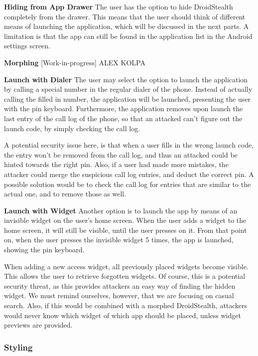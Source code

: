 \textbf{Hiding from App Drawer}
The user has the option to hide DroidStealth completely from the drawer. This 
means that the user should think of different means of launching the application, 
which will be discussed in the next parts. A limitation is that the app can still be found
in the application list in the Android settings screen. 

\textbf{Morphing}
[Work-in-progress] ALEX KOLPA

\textbf{Launch with Dialer}
The user may select the option to launch the application by calling a special number
in the regular dialer of the phone. Instead of actually calling the filled in number, the
application will be launched, presenting the user with the pin keyboard. Furthermore,
the application removes upon launch the last entry of the call log of the phone, so that
an attacked can't figure out the launch code, by simply checking the call log.

A potential security issue here, is that when a user fills in the wrong launch code, the 
entry won't be removed from the call log, and thus an attacked could be hinted towards
the right pin. Also, if a user had made more mistakes, the attacker could merge the 
suspicious call log entries, and deduct the correct pin. A possible solution would be to
check the call log for entries that are similar to the actual one, and to remove those as well.

\textbf{Launch with Widget}
Another option is to launch the app by means of an invisible widget on the user's home screen. 
When the user adds a widget to the home screen, it will still be visible, until the user presses on it. 
From that point on, when the user presses the invisible widget 5 times, the app is launched, showing the pin keyboard.

When adding a new access widget, all previously placed widgets become visible. This allows 
the user to retrieve forgotten widgets. Of course, this is a potential security threat, as this 
provides attackers an easy way of finding the hidden widget. We must remind ourselves, 
however, that we are focusing on casual search. Also, if this would be combined with
a morphed DroidStealth, attackers would never know which widget of which app should be
placed, unless widget previews are provided.

\subsubsection{Styling}

